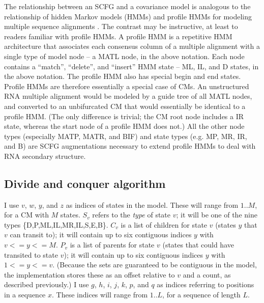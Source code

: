 \documentclass[11pt]{article}
\begin{document}
The relationship between an SCFG and a covariance model is analogous
to the relationship of hidden Markov models (HMMs) and profile HMMs
for modeling multiple sequence alignments
\cite{Krogh94,Durbin98,Eddy98}.  The contrast may be instructive, at
least to readers familiar with profile HMMs.  A profile HMM is a
repetitive HMM architecture that associates each consensus column of a
multiple alignment with a single type of model node -- a MATL node, in
the above notation. Each node contains a ``match'', ``delete'', and
``insert'' HMM state -- ML, IL, and D states, in the above notation.
The profile HMM also has special begin and end states. Profile HMMs
are therefore essentially a special case of CMs. An unstructured RNA
multiple alignment would be modeled by a guide tree of all MATL nodes,
and converted to an unbifurcated CM that would essentially be
identical to a profile HMM. (The only difference is trivial; the CM
root node includes a IR state, whereas the start node of a profile HMM
does not.) All the other node types (especially MATP, MATR, and BIF)
and state types (e.g. MP, MR, IR, and B) are SCFG augmentations
necessary to extend profile HMMs to deal with RNA secondary structure.




\subsection{Divide and conquer algorithm}

I use $v$, $w$, $y$, and $z$ as indices of states in the model. These
will range from $1..M$, for a CM with $M$ states. $S_v$ refers to the
\emph{type} of state $v$; it will be one of the nine types
\{D,P,ML,IL,MR,IL,S,E,B\}. $C_v$ is a list of children for state $v$
(states $y$ that $v$ can transit to); it will contain up to six
contiguous indices $y$ with $v <= y <= M$. $P_v$ is a list of parents
for state $v$ (states that could have transited to state $v$); it will
contain up to six contiguous indices $y$ with $1 <= y <= v$. (Because
the sets are guaranteed to be contiguous in the model, the
implementation stores these as an offset relative to $v$ and a count,
as described previously.) I use $g$, $h$, $i$, $j$, $k$, $p$, and $q$
as indices referring to positions in a sequence $x$. These indices
will range from $1..L$, for a sequence of length $L$.
\end{document}
